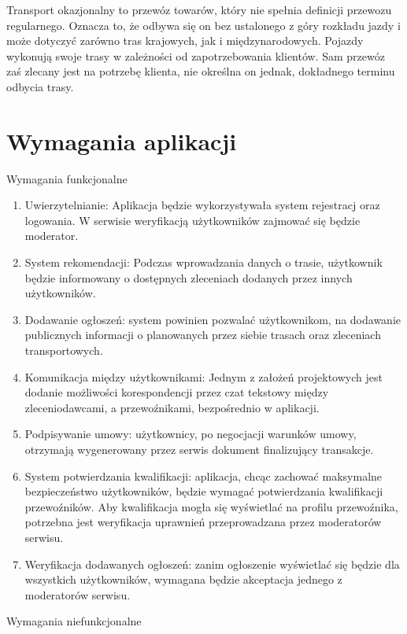 Transport okazjonalny to przewóz towarów, który nie spełnia definicji przewozu regularnego. Oznacza to, że odbywa się on bez ustalonego z góry rozkładu jazdy i może dotyczyć zarówno tras krajowych, jak i międzynarodowych. Pojazdy wykonują swoje trasy w zależności od zapotrzebowania klientów. Sam przewóz zaś zlecany jest na potrzebę klienta, nie określna on jednak, dokładnego terminu odbycia trasy.

\section{Wymagania aplikacji}
Wymagania funkcjonalne
\begin{enumerate}
\item Uwierzytelnianie: Aplikacja będzie wykorzystywała system rejestracj oraz logowania. W serwisie weryfikacją użytkowników zajmować się będzie moderator.
\item System rekomendacji: Podczas wprowadzania danych o trasie, użytkownik będzie informowany o dostępnych zleceniach dodanych przez innych użytkowników.
\item Dodawanie ogłoszeń: system powinien pozwalać użytkownikom, na dodawanie publicznych informacji o planowanych przez siebie trasach oraz zleceniach transportowych.
\item Komunikacja między użytkownikami: Jednym z założeń projektowych jest dodanie możliwości korespondencji przez czat tekstowy między zleceniodawcami, a przewoźnikami, bezpośrednio w aplikacji.
\item Podpisywanie umowy: użytkownicy, po negocjacji warunków umowy, otrzymają wygenerowany przez serwis dokument finalizujący transakcje.
\item System potwierdzania kwalifikacji: aplikacja, chcąc zachować maksymalne bezpieczeństwo użytkowników, będzie wymagać potwierdzania kwalifikacji przewoźników. Aby kwalifikacja mogła się wyświetlać na profilu przewoźnika, potrzebna jest weryfikacja uprawnień przeprowadzana przez moderatorów serwisu.
\item Weryfikacja dodawanych ogłoszeń: zanim ogłoszenie wyświetlać się będzie dla wszystkich użytkowników, wymagana będzie akceptacja jednego z moderatorów serwisu.
\end{enumerate}
Wymagania niefunkcjonalne
